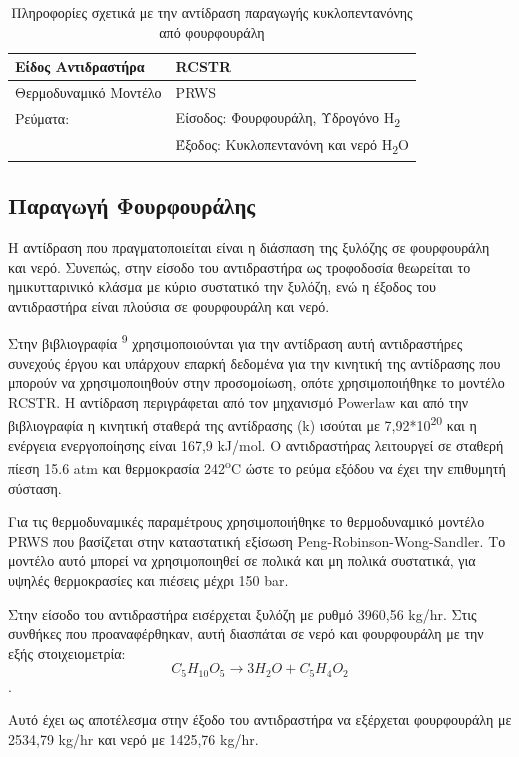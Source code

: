 \documentclass[11pt]{article}
\makeatletter
\newcommand{\citeprocitem}[2]{\hyper@linkstart{cite}{citeproc_bib_item_#1}#2\hyper@linkend}
\makeatother
\begin{document}
\pagebreak
\begin{table}[htbp]
\caption{Πληροφορίες σχετικά με την αντίδραση παραγωγής κυκλοπεντανόνης από φουρφουράλη}
\centering
\begin{tabular}{ll}
Είδος Αντιδραστήρα & RCSTR\\
\hline
Θερμοδυναμικό Μοντέλο & PRWS\\
Ρεύματα: & Είσοδος: Φουρφουράλη, Υδρογόνο H\textsubscript{2}\\
 & Έξοδος: Κυκλοπεντανόνη και νερό H\textsubscript{2}O\\
\end{tabular}
\end{table}

\subsection{Παραγωγή Φουρφουράλης}
\label{sec:orga3a4107}
 Η αντίδραση που πραγματοποιείται είναι
η διάσπαση της ξυλόζης σε φουρφουράλη και νερό. Συνεπώς, στην είσοδο του
αντιδραστήρα ως τροφοδοσία θεωρείται το ημικυτταρινικό κλάσμα με κύριο
συστατικό την ξυλόζη, ενώ η έξοδος του αντιδραστήρα είναι πλούσια σε
φουρφουράλη και νερό.

Στην βιβλιογραφία \textsuperscript{\citeprocitem{9}{9}} χρησιμοποιούνται για την αντίδραση αυτή αντιδραστήρες συνεχούς έργου και υπάρχουν επαρκή
δεδομένα για την κινητική της αντίδρασης που μπορούν να χρησιμοποιηθούν
στην προσομοίωση, οπότε χρησιμοποιήθηκε το μοντέλο RCSTR. Η αντίδραση
περιγράφεται από τον μηχανισμό Powerlaw και από την βιβλιογραφία η
κινητική σταθερά της αντίδρασης (k) ισούται με 7,92*10\textsuperscript{20} και η
ενέργεια ενεργοποίησης είναι 167,9 kJ/mol. Ο αντιδραστήρας λειτουργεί σε
σταθερή πίεση 15.6 atm και θερμοκρασία 242\textsuperscript{o}C ώστε το ρεύμα εξόδου να
έχει την επιθυμητή σύσταση.

Για τις θερμοδυναμικές παραμέτρους χρησιμοποιήθηκε το θερμοδυναμικό
μοντέλο PRWS που βασίζεται στην καταστατική εξίσωση
Peng-Robinson-Wong-Sandler. Το μοντέλο αυτό μπορεί να χρησιμοποιηθεί σε
πολικά και μη πολικά συστατικά, για υψηλές θερμοκρασίες και πιέσεις
μέχρι 150 bar.

Στην είσοδο του αντιδραστήρα εισέρχεται ξυλόζη με ρυθμό 3960,56 kg/hr.
Στις συνθήκες που προαναφέρθηκαν, αυτή διασπάται σε νερό και φουρφουράλη
με την εξής στοιχειομετρία: \[ C_5H_{10}O_5 \rightarrow 3H_2O + C_5H_4O_2 \].

Αυτό έχει ως αποτέλεσμα στην έξοδο του αντιδραστήρα να εξέρχεται
φουρφουράλη με 2534,79 kg/hr και νερό με 1425,76 kg/hr.
\end{document}
